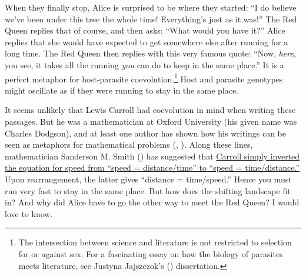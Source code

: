\documentclass[
  american,
  letterpaper,
]{book}
\begin{document}
When they finally stop, Alice is surprised to be where they started: ``I
do believe we've been under this tree the whole time! Everything's just
as it was!'' The Red Queen replies that of course, and then asks: ``What
would you have it?'' Alice replies that she would have expected to get
somewhere else after running for a long time. The Red Queen then replies
with this very famous quote: ``Now, \emph{here}, you see, it takes all
the running \emph{you} can do to keep in the same place.'' It is a
perfect metaphor for host-parasite coevolution.\footnote{The
  intersection between science and literature is not restricted to
  selection for or against sex. For a fascinating essay on how the
  biology of parasites meets literature, see Justyna Jajszczok's
  () dissertation.} Host and parasite
genotypes might oscillate as if they were running to stay in the same
place.

It seems unlikely that Lewis Carroll had coevolution in mind when
writing these passages. But he was a mathematician at Oxford University
(his given name was Charles Dodgson), and at least one author has shown
how his writings can be seen as metaphors for mathematical problems
(,
). Along these lines, mathematician
Sanderson M. Smith () has suggested that
\href{http://www.herkimershideaway.org/writings/carroll.htm}{Carroll
simply inverted the equation for speed from ``speed = distance/time'' to
``speed = time/distance.''} Upon rearrangement, the latter gives
``distance = time/speed.'' Hence you must run very fast to stay in the
same place. But how does the shifting landscape fit in? And why did
Alice have to go the other way to meet the Red Queen? I would love to
know.
\end{document}
